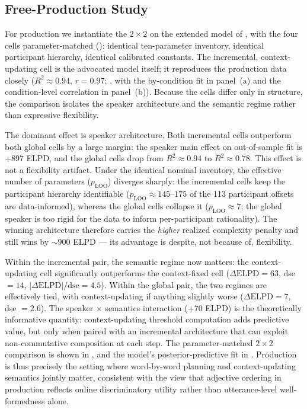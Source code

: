 \documentclass[man,floatsintext]{apa7}
\begin{document}
\subsection{Free-Production Study}

For production we instantiate the $2 \times 2$ on the extended model of , with the four cells parameter-matched (): identical ten-parameter inventory, identical participant hierarchy, identical calibrated constants.
The incremental, context-updating cell is the advocated model itself; it reproduces the production data closely ($R^2 \approx 0.94$, $r = 0.97$; , with the by-condition fit in panel~(a) and the condition-level correlation in panel~(b)).
Because the cells differ only in structure, the comparison isolates the speaker architecture and the semantic regime rather than expressive flexibility.

The dominant effect is speaker architecture.
Both incremental cells outperform both global cells by a large margin: the speaker main effect on out-of-sample fit is $+897$ ELPD, and the global cells drop from $R^2 \approx 0.94$ to $R^2 \approx 0.78$.
This effect is not a flexibility artifact.
Under the identical nominal inventory, the effective number of parameters ($p_{\text{LOO}}$) diverges sharply: the incremental cells keep the participant hierarchy identifiable ($p_{\text{LOO}} \approx 145$--$175$ of the 113 participant offsets are data-informed), whereas the global cells collapse it ($p_{\text{LOO}} \approx 7$; the global speaker is too rigid for the data to inform per-participant rationality).
The winning architecture therefore carries the \emph{higher} realized complexity penalty and still wins by $\sim\!900$ ELPD --- its advantage is despite, not because of, flexibility.

Within the incremental pair, the semantic regime now matters: the context-updating cell significantly outperforms the context-fixed cell ($\Delta\text{ELPD} = 63$, dse $= 14$, $|\Delta\text{ELPD}|/\text{dse} = 4.5$).
Within the global pair, the two regimes are effectively tied, with context-updating if anything slightly worse ($\Delta\text{ELPD} = 7$, dse $= 2.6$).
The speaker $\times$ semantics interaction ($+70$ ELPD) is the theoretically informative quantity: context-updating threshold computation adds predictive value, but only when paired with an incremental architecture that can exploit non-commutative composition at each step.
The parameter-matched $2 \times 2$ comparison is shown in , and the model's posterior-predictive fit in .
Production is thus precisely the setting where word-by-word planning and context-updating semantics jointly matter, consistent with the view that adjective ordering in production reflects online discriminatory utility rather than utterance-level well-formedness alone.
\end{document}
